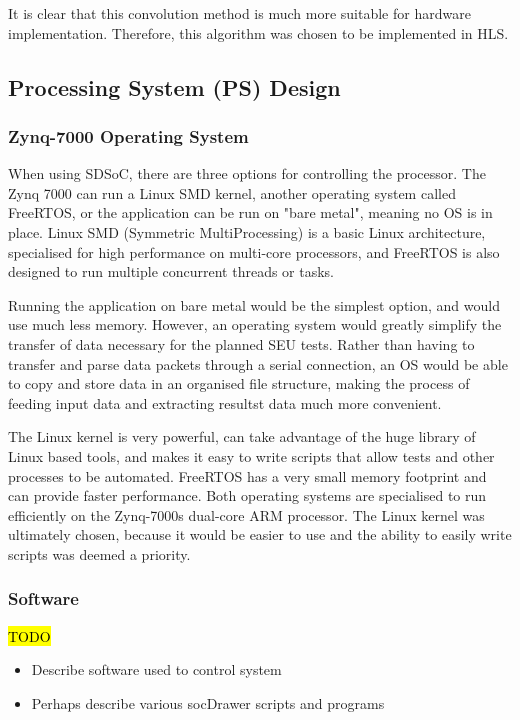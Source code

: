 \documentclass[12pt]{article}
\begin{document}
It is clear that this convolution method is much more suitable for hardware implementation. Therefore, this algorithm was chosen to be implemented in HLS.

\subsection{Processing System (PS) Design}
\label{sec:Design-PS}

\subsubsection{Zynq-7000 Operating System}
\label{sec:Design-PS-OS}

When using SDSoC, there are three options for controlling the processor. The Zynq 7000 can run a Linux SMD kernel, another operating system called FreeRTOS, or the application can be run on "bare metal", meaning no OS is in place. Linux SMD (Symmetric MultiProcessing) is a basic Linux architecture, specialised for high performance on multi-core processors, and FreeRTOS is also designed to run multiple concurrent threads or tasks.

Running the application on bare metal would be the simplest option, and would use much less memory. However, an operating system would greatly simplify the transfer of data necessary for the planned SEU tests. Rather than having to transfer and parse data packets through a serial connection, an OS would be able to copy and store data in an organised file structure, making the process of feeding input data and extracting resultst data much more convenient.

The Linux kernel is very powerful, can take advantage of the huge library of Linux based tools, and makes it easy to write scripts that allow tests and other processes to be automated. FreeRTOS has a very small memory footprint and can provide faster performance. Both operating systems are specialised to run efficiently on the Zynq-7000s dual-core ARM processor. The Linux kernel was ultimately chosen, because it would be easier to use and the ability to easily write scripts was deemed a priority.

\subsubsection{Software}
\label{sec:Design-PS-SW}

\hl{TODO}

\begin{itemize}
\item Describe software used to control system
\item Perhaps describe various socDrawer scripts and programs
\end{itemize}
\end{document}
